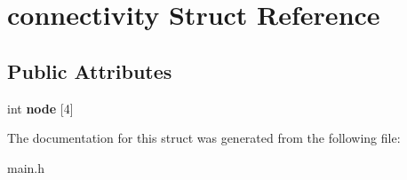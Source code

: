 \hypertarget{structconnectivity}{}\section{connectivity Struct Reference}
\label{structconnectivity}
\subsection*{Public Attributes}
\begin{DoxyCompactItemize}
\item 
\mbox{\label{structconnectivity_af0fc7c1443c916dce333bee34787cd20}} 
int {\bfseries node} \mbox{[}4\mbox{]}
\end{DoxyCompactItemize}


The documentation for this struct was generated from the following file\+:\begin{DoxyCompactItemize}
\item 
main.\+h\end{DoxyCompactItemize}
